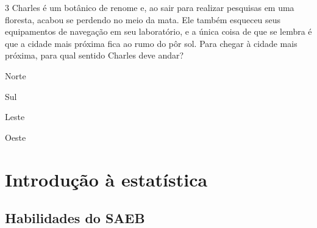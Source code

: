 {{%






\num{3} Charles é um botânico de renome e, ao sair para realizar pesquisas em
uma floresta, acabou se perdendo no meio da mata. Ele também esqueceu
seus equipamentos de navegação em seu laboratório, e a única coisa de
que se lembra é que a cidade mais próxima fica ao rumo do pôr sol. Para
chegar à cidade mais próxima, para qual sentido Charles deve andar?

\begin{escolha}[itemsep=0pt]
\item Norte
\item Sul
\item Leste
\item Oeste 
\end{escolha}







\chapter{Introdução à estatística}

\section*{Habilidades do SAEB}

}}

